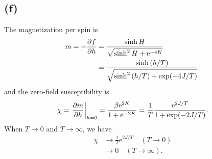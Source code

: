 \documentclass{article}
\newcommand{\me}{\mathrm{e}}
\begin{document}
\subsection*{(f)}
The magnetization per spin is 
\begin{equation}
    \begin{split}
        m=-\pdv{f}{h}&=\frac{\sinh{H}}{\sqrt{\sinh^2{H}+\me^{-4K}}}\\
                    &=\frac{\sinh{(h/T)}}{\sqrt{\sinh^2{(h/T)}+\exp(-4J/T)}}.
    \end{split}
\end{equation}
and the zero-field susceptibility is
\begin{equation}
    \chi=\eval{\pdv{m}{h}}_{h=0}=\frac{\beta \me^{2K}}{1+\me^{-2K}}=\frac{1}{T}\frac{\me^{2J/T}}{1+\exp(-2J/T)}.
\end{equation}
When $T\to 0$ and $T\to\infty$, we have 
\begin{equation}
    \begin{split}
        \chi&\to \frac{1}{T}\me^{2J/T} \quad (T\to 0)\\
            &\to 0 \quad (T\to\infty).
    \end{split}
\end{equation}
\end{document}
